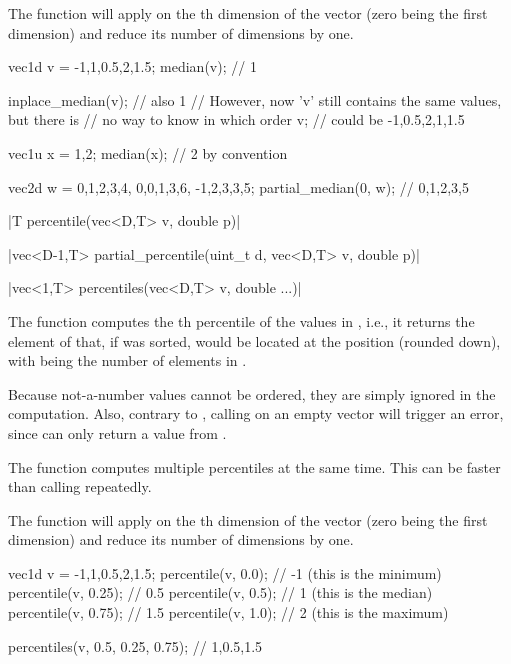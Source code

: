 The function  will apply  on the th dimension of the vector (zero being the first dimension) and reduce its number of dimensions by one.

\begin{example}
\begin{cppcode}
vec1d v = {-1,1,0.5,2,1.5};
median(v); // 1

inplace_median(v); // also 1
// However, now 'v' still contains the same values, but there is
// no way to know in which order
v; // could be {-1,0.5,2,1,1.5}

vec1u x = {1,2};
median(x); // 2 by convention

vec2d w = {{0,1,2,3,4}, {0,0,1,3,6}, {-1,2,3,3,5}};
partial_median(0, w); // {0,1,2,3,5}
\end{cppcode}
\end{example}

\funcitem \cppinline|T percentile(vec<D,T> v, double p)| 

\cppinline|vec<D-1,T> partial_percentile(uint_t d, vec<D,T> v, double p)| 

\cppinline|vec<1,T> percentiles(vec<D,T> v, double ...)| 

The function  computes the th percentile of the values in , i.e., it returns the element of  that, if  was sorted, would be located at the position  (rounded down), with  being the number of elements in .

Because not-a-number values cannot be ordered, they are simply ignored in the computation. Also,
contrary to , calling  on an empty vector will trigger an error, since  can only return a value from .

The function  computes multiple percentiles at the same time. This can be faster than calling  repeatedly.

The function  will apply  on the th dimension of the vector (zero being the first dimension) and reduce its number of dimensions by one.

\begin{example}
\begin{cppcode}
vec1d v = {-1,1,0.5,2,1.5};
percentile(v, 0.0);  // -1 (this is the minimum)
percentile(v, 0.25); // 0.5
percentile(v, 0.5);  // 1 (this is the median)
percentile(v, 0.75); // 1.5
percentile(v, 1.0);  // 2 (this is the maximum)

percentiles(v, 0.5, 0.25, 0.75); // {1,0.5,1.5}
\end{cppcode}
\end{example}

